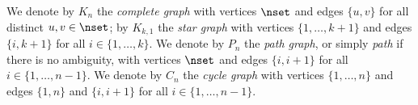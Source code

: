 We denote by $K_n$ the \emph{complete graph} with vertices $\nset$
and edges $\{u,v\}$ for all distinct $u,v \in \nset$; by $K_{k, 1}$
the \emph{star graph} with vertices $\{1, \ldots, k + 1\}$ and edges
$\{i, k + 1\}$ for all $i \in \{1, \ldots, k\}$. We denote by $P_n$ the
\emph{path graph}, or simply \emph{path} if there is no ambiguity, with vertices
$\nset$ and edges $\{i, i + 1\}$ for all $i \in \{1, \ldots, n-
1\}$. We denote by $C_n$ the \emph{cycle graph} with vertices $\{1, \ldots,
n\}$ and edges $\{1, n\}$ and $\{i, i + 1\}$ for all $i \in \{1, \ldots, n-
1\}$.
